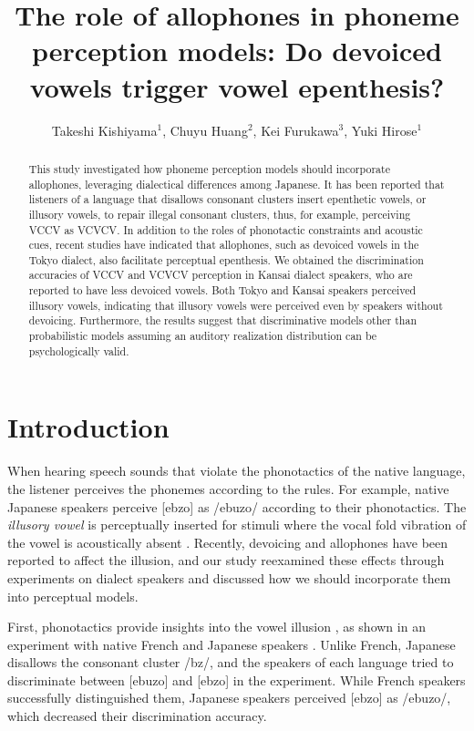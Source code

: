 \documentclass[a4paper,11pt,twocolumn]{article}
\title{The role of allophones in phoneme perception models: Do devoiced vowels trigger vowel epenthesis?}
\author{
    Takeshi Kishiyama$^1$,
    Chuyu Huang$^2$,
    Kei Furukawa$^3$,
    Yuki Hirose$^1$}
\begin{document}
\maketitle

\begin{abstract}
This study investigated how phoneme perception models should incorporate allophones, leveraging dialectical differences among Japanese. It has been reported that listeners of a language that disallows consonant clusters insert epenthetic vowels, or illusory vowels, to repair illegal consonant clusters, thus, for example, perceiving VCCV as VCVCV. In addition to the roles of phonotactic constraints and acoustic cues, recent studies have indicated that allophones, such as devoiced vowels in the Tokyo dialect, also facilitate perceptual epenthesis. We obtained the discrimination accuracies of VCCV and VCVCV perception in Kansai dialect speakers, who are reported to have less devoiced vowels. Both Tokyo and Kansai speakers perceived illusory vowels, indicating that illusory vowels were perceived even by speakers without devoicing. Furthermore, the results suggest that discriminative models other than probabilistic models assuming an auditory realization distribution can be psychologically valid.
\end{abstract}


\section{Introduction}

When hearing speech sounds that violate the phonotactics of the native language, the listener perceives the phonemes according to the rules. For example, native Japanese speakers perceive [ebzo] as /ebuzo/ according to their phonotactics. The \textit{illusory vowel} is perceptually inserted for stimuli where the vocal fold vibration of the vowel is acoustically absent \cite{dupoux1999epentheticvi, dupoux2011illusory}. Recently, devoicing and allophones have been reported to affect the illusion, and our study reexamined these effects through experiments on dialect speakers and discussed how we should incorporate them into perceptual models.

First, phonotactics provide insights into the vowel illusion \cite{dupoux1999epentheticvi, halle2014special, monahan2009not, mattingley2015influence, guevara2017predicting, guevara2017epenthetic}, as shown in an experiment with native French and Japanese speakers \cite{dupoux1999epentheticvi}. Unlike French, Japanese disallows the consonant cluster /bz/, and the speakers of each language tried to discriminate between [ebuzo] and [ebzo] in the experiment. While French speakers successfully distinguished them, Japanese speakers perceived [ebzo] as /ebuzo/, which decreased their discrimination accuracy.
\end{document}
